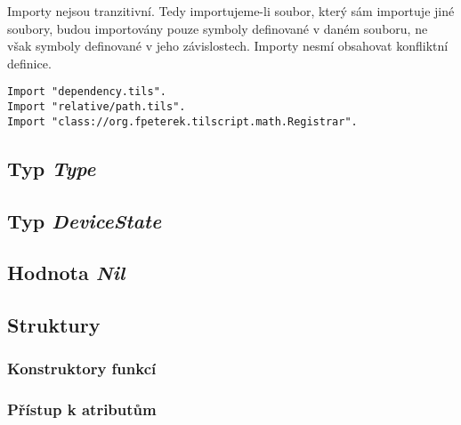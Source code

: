 Importy nejsou tranzitivní. Tedy importujeme-li soubor, který sám importuje jiné soubory, budou
importovány pouze symboly definované v daném souboru, ne však symboly definované v jeho
závislostech. Importy nesmí obsahovat konfliktní definice.

\begin{lstlisting}[caption={Příklad využití výrazů Import}]
Import "dependency.tils".
Import "relative/path.tils".
Import "class://org.fpeterek.tilscript.math.Registrar".
\end{lstlisting}

\subsection{Typ \textit{Type}} \label{nil-value}

\subsection{Typ \textit{DeviceState}} \label{nil-value}

\subsection{Hodnota \textit{Nil}} \label{nil-value}

\subsection{Struktury} \label{structs}

\subsubsection{Konstruktory funkcí}

\subsubsection{Přístup k atributům}

\endinput
